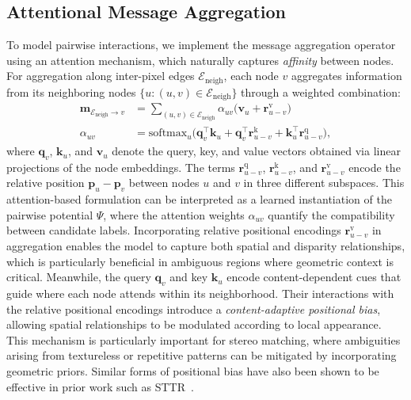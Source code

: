 \subsection{Attentional Message Aggregation}
To model pairwise interactions, we implement the message aggregation operator using an attention mechanism, which naturally captures \emph{affinity} between nodes.
For aggregation along inter-pixel edges $\mathcal{E}_{\mathrm{neigh}}$, each node $v$ aggregates information from its neighboring nodes $\{u : (u,v) \in \mathcal{E}_{\mathrm{neigh}}\}$ through a weighted combination:
\begin{equation}
	\begin{aligned}
		\mathbf{m}_{\mathcal{E}_{\mathrm{neigh}} \rightarrow v}
		&= \sum_{(u,v)\in\mathcal{E}_{\mathrm{neigh}}} \alpha_{uv} \big(\mathbf{v}_u + \mathbf{r}^{\mathrm{v}}_{u-v}\big)\\
		\alpha_{uv}
		&= \mathrm{softmax}_u \Big( \mathbf{q}_v^\top \mathbf{k}_u
		+ \mathbf{q}_v^\top \mathbf{r}^{\mathrm{k}}_{u-v}
		+ \mathbf{k}_u^\top \mathbf{r}^{\mathrm{q}}_{u-v} \Big),
	\end{aligned}
	\label{eq:nmrf_agg}
\end{equation}
where $\mathbf{q}_v$, $\mathbf{k}_u$, and $\mathbf{v}_u$ denote the query, key, and value vectors obtained via linear projections of the node embeddings. The terms $\mathbf{r}^{\mathrm{q}}_{u-v}$, $\mathbf{r}^{\mathrm{k}}_{u-v}$, and $\mathbf{r}^{\mathrm{v}}_{u-v}$ encode the relative position $\mathbf{p}_u-\mathbf{p}_v$ between nodes $u$ and $v$ in three different subspaces.
This attention-based formulation can be interpreted as a learned instantiation of the pairwise potential $\Psi$, where the attention weights $\alpha_{uv}$ quantify the compatibility between candidate labels.
Incorporating relative positional encodings $\mathbf{r}_{u-v}^\mathrm{v}$ in aggregation enables the model to capture both spatial and disparity relationships, which is particularly beneficial in ambiguous regions where geometric context is critical.
Meanwhile, the query $\mathbf{q}_v$ and key $\mathbf{k}_u$ encode content-dependent cues that guide where each node attends within its neighborhood.
Their interactions with the relative positional encodings introduce a \emph{content-adaptive positional bias}, allowing spatial relationships to be modulated according to local appearance. 
This mechanism is particularly important for stereo matching, where ambiguities arising from textureless or repetitive patterns can be mitigated by incorporating geometric priors. Similar forms of positional bias have also been shown to be effective in prior work such as STTR~\cite{li2021revisiting}.

